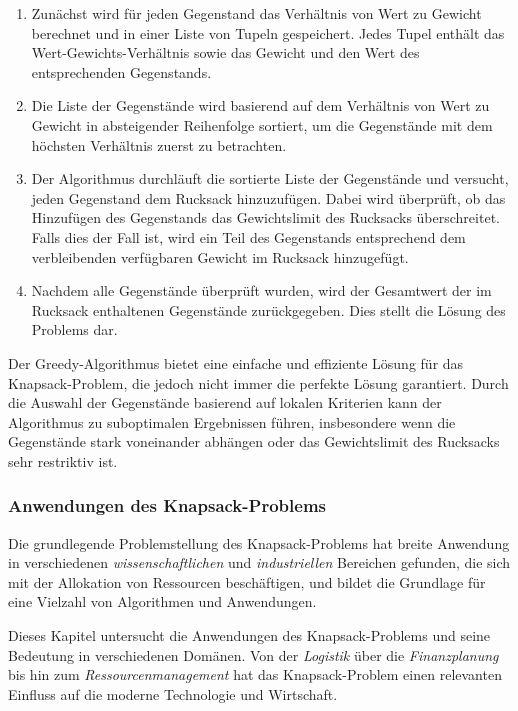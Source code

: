 \begin{itemize}
\begin{enumerate}
\item Zunächst wird für jeden Gegenstand das Verhältnis von Wert zu Gewicht berechnet und in einer Liste von Tupeln
gespeichert. Jedes Tupel enthält das Wert-Gewichts-Verhältnis sowie das Gewicht und den Wert des entsprechenden Gegenstands.
\item Die Liste der Gegenstände wird basierend auf dem Verhältnis von Wert zu Gewicht in absteigender Reihenfolge
sortiert, um die Gegenstände mit dem höchsten Verhältnis zuerst zu betrachten.
\item Der Algorithmus durchläuft die sortierte Liste der Gegenstände und versucht, jeden Gegenstand dem Rucksack
hinzuzufügen. Dabei wird überprüft, ob das Hinzufügen des Gegenstands das Gewichtslimit des Rucksacks überschreitet.
Falls dies der Fall ist, wird ein Teil des Gegenstands entsprechend dem verbleibenden verfügbaren Gewicht im Rucksack hinzugefügt.
\item Nachdem alle Gegenstände überprüft wurden, wird der Gesamtwert der im Rucksack enthaltenen Gegenstände zurückgegeben.
Dies stellt die Lösung des Problems dar.
\end{enumerate}

Der Greedy-Algorithmus bietet eine einfache und effiziente Lösung für das Knapsack-Problem, die jedoch nicht immer die
perfekte Lösung garantiert. Durch die Auswahl der Gegenstände basierend auf lokalen Kriterien kann der Algorithmus zu
suboptimalen Ergebnissen führen, insbesondere wenn die Gegenstände stark voneinander abhängen oder das Gewichtslimit des
Rucksacks sehr restriktiv ist.

\subsubsection{Anwendungen des Knapsack-Problems}
Die grundlegende Problemstellung des Knapsack-Problems hat breite Anwendung in verschiedenen \textit{wissenschaftlichen}
und \textit{industriellen} Bereichen gefunden, die sich mit der Allokation von Ressourcen beschäftigen, und bildet die
Grundlage für eine Vielzahl von Algorithmen und Anwendungen.

Dieses Kapitel untersucht die Anwendungen des Knapsack-Problems und seine Bedeutung in verschiedenen Domänen. Von der
\textit{Logistik} über die \textit{Finanzplanung} bis hin zum \textit{Ressourcenmanagement} hat das Knapsack-Problem
einen relevanten Einfluss auf die moderne Technologie und Wirtschaft.


\end{itemize}
